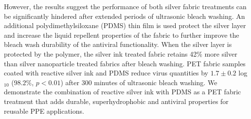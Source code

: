\documentclass[10pt,letterpaper]{article}
\begin{document}
However, the results suggest the performance of both silver fabric treatments can be significantly hindered after extended periods of ultrasonic bleach washing. 
An additional polydimethylsiloxane (PDMS) thin film is used protect the silver layer and increase the liquid repellent properties of the fabric to further improve %
the bleach wash durability of the antiviral functionality. 
When the silver layer is protected by the polymer, the silver ink treated fabric retains 42\% more silver than silver nanoparticle treated fabrics after bleach washing.
PET fabric samples coated with reactive silver ink and PDMS reduce virus quantities by $1.7 \pm 0.2$ log$_{10}$ ($98.2 %
\%$, $p < 0.01$) after 300 minutes of ultrasonic bleach washing. 
We demonstrate the combination of reactive silver ink with PDMS as a PET fabric treatment that adds durable, superhydrophobic and antiviral properties for reusable PPE applications. 


\end{document}
